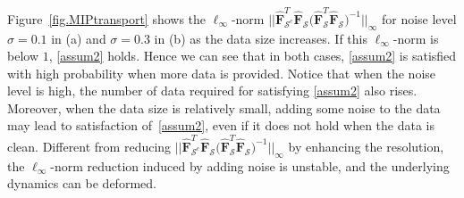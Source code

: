 \documentclass[a4paper,11pt]{article}
\begin{document}
Figure~\ref{fig.MIPtransport} shows the $\ell_\infty$-norm  $||\widehat{\mathbf{F}}_{\mathcal{S}^c}^T\widehat{\mathbf{F}}_{\mathcal{S}}\big(\widehat{\mathbf{F}}_{\mathcal{S}}^T\widehat{\mathbf{F}}_{\mathcal{S}}\big)^{-1}||_\infty$ for noise level $\sigma=0.1$ in (a) and $\sigma=0.3$ in (b) as the data size increases. If this $\ell_\infty$-norm is below $1$, \eqref{assum2} holds. Hence we can see that in both cases, \eqref{assum2} is satisfied with high probability when more data is provided. Notice that when the noise level is high, the number of data required for satisfying  \eqref{assum2} also rises. Moreover,  when the data size is relatively small, adding some noise to the data may lead to  satisfaction of~\eqref{assum2}, even if it does not hold when the data is clean. Different from reducing $||\widehat{\mathbf{F}}_{\mathcal{S}^c}^T\widehat{\mathbf{F}}_{\mathcal{S}}\big(\widehat{\mathbf{F}}_{\mathcal{S}}^T\widehat{\mathbf{F}}_{\mathcal{S}}\big)^{-1}||_\infty$ by  enhancing the resolution, the $\ell_\infty$-norm reduction induced by adding noise is unstable, and the underlying dynamics can be deformed.
\end{document}
